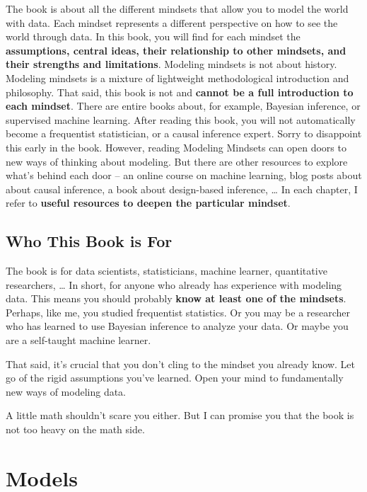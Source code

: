 \documentclass[
  10pt,
]{scrbook}
\begin{document}
The book is about all the different mindsets that allow you to model the world with data.
Each mindset represents a different perspective on how to see the world through data.
In this book, you will find for each mindset the \textbf{assumptions, central ideas, their relationship to other mindsets, and their strengths and limitations}.
Modeling mindsets is not about history.
Modeling mindsets is a mixture of lightweight methodological introduction and philosophy.
That said, this book is not and \textbf{cannot be a full introduction to each mindset}.
There are entire books about, for example, Bayesian inference, or supervised machine learning.
After reading this book, you will not automatically become a frequentist statistician, or a causal inference expert.
Sorry to disappoint this early in the book.
However, reading Modeling Mindsets can open doors to new ways of thinking about modeling.
But there are other resources to explore what's behind each door -- an online course on machine learning, blog posts about about causal inference, a book about design-based inference, \ldots{}
In each chapter, I refer to \textbf{useful resources to deepen the particular mindset}.

\hypertarget{who-this-book-is-for}{%
\section{Who This Book is For}\label{who-this-book-is-for}}

The book is for data scientists, statisticians, machine learner, quantitative researchers, \ldots{}
In short, for anyone who already has experience with modeling data.
This means you should probably \textbf{know at least one of the mindsets}.
Perhaps, like me, you studied frequentist statistics.
Or you may be a researcher who has learned to use Bayesian inference to analyze your data.
Or maybe you are a self-taught machine learner.

That said, it's crucial that you don't cling to the mindset you already know.
Let go of the rigid assumptions you've learned.
Open your mind to fundamentally new ways of modeling data.

A little math shouldn't scare you either.
But I can promise you that the book is not too heavy on the math side.

\mainmatter

\hypertarget{models}{%
\chapter{Models}\label{models}}
\end{document}
